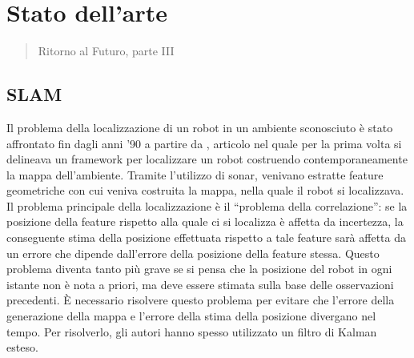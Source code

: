\chapter{Stato dell'arte}
\label{capitolo2}
\thispagestyle{empty}

\begin{quotation}
{\footnotesize
{}
\begin{flushright}
Ritorno al Futuro, parte III
\end{flushright}
}
\end{quotation}
\vspace{0.5cm}

\section{SLAM}

Il problema della localizzazione di un robot in un ambiente sconosciuto è stato affrontato fin dagli anni '90 a partire da \cite{174711}, articolo nel quale per la prima volta si delineava un framework per localizzare un robot costruendo contemporaneamente la mappa dell'ambiente.
Tramite l'utilizzo di sonar, venivano estratte feature geometriche con cui veniva costruita la mappa, nella quale il robot si localizzava. 
Il problema principale della localizzazione è il ``problema della correlazione'': se la posizione della feature rispetto alla quale ci si localizza è affetta da incertezza, la conseguente stima della posizione effettuata rispetto a tale feature sarà affetta da un errore che dipende dall'errore della posizione della feature stessa. 
Questo problema diventa tanto più grave se si pensa che la posizione del robot in ogni istante non è nota a priori, ma deve essere stimata sulla base delle osservazioni precedenti. 
\`E necessario risolvere questo problema per evitare che l'errore della generazione della mappa e l'errore della stima della posizione divergano nel tempo. 
Per risolverlo, gli autori hanno spesso utilizzato un filtro di Kalman esteso.


